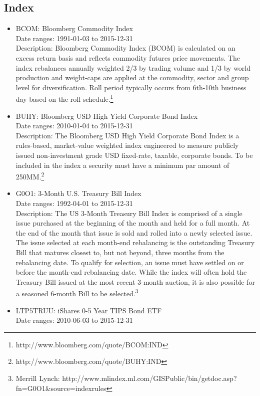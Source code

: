 \documentclass[12pt]{article}
\begin{document}
\subsection{Index}

\begin{itemize}
\item BCOM: Bloomberg Commodity Index\\
Date ranges: 1991-01-03 to 2015-12-31\\
Description: Bloomberg Commodity Index (BCOM) is calculated on an excess return basis and reflects commodity futures price movements. The index rebalances annually weighted 2/3 by trading volume and 1/3 by world production and weight-caps are applied at the commodity, sector and group level for diversification. Roll period typically occurs from 6th-10th business day based on the roll schedule.\footnote{http://www.bloomberg.com/quote/BCOM:IND}
\item BUHY: Bloomberg USD High Yield Corporate Bond Index\\
Date ranges: 2010-01-04 to 2015-12-31 \\
Description: The Bloomberg USD High Yield Corporate Bond Index is a rules-based, market-value weighted index engineered to measure publicly issued non-investment grade USD fixed-rate, taxable, corporate bonds. To be included in the index a security must have a minimum par amount of 250MM.\footnote{http://www.bloomberg.com/quote/BUHY:IND}
\item G0O1: 3-Month U.S. Treasury Bill Index\\
Date ranges: 1992-04-01 to 2015-12-31 \\
Description: The US 3-Month Treasury Bill Index is comprised of a single issue purchased at the beginning of the
month and held for a full month. At the end of the month that issue is sold and rolled into a newly selected issue. The
issue selected at each month-end rebalancing is the outstanding Treasury Bill that matures closest to, but not beyond, three
months from the rebalancing date. To qualify for selection, an issue must have settled on or before the month-end
rebalancing date. While the index will often hold the Treasury Bill issued at the most recent 3-month auction, it is also
possible for a seasoned 6-month Bill to be selected.\footnote{Merrill Lynch: http://www.mlindex.ml.com/GISPublic/bin/getdoc.asp?fn=G0O1\&source=indexrules}
\item LTP5TRUU: iShares 0-5 Year TIPS Bond ETF\\
Date ranges: 2010-06-03 to 2015-12-31 \\

\end{itemize}
\end{document}
